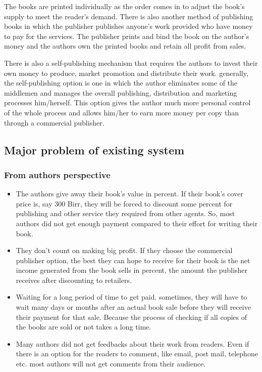 The books are printed individually as the order comes in to adjust the book's supply to meet the reader's demand.  There is also another method of publishing books in which the publisher publishes anyone’s work provided who have money to pay for the services. The publisher prints and bind the book on the author's money and the authors own the printed books and retain all profit from sales.

There is also a self-publishing mechanism that requires the authors to invest their own money to produce, market promotion and distribute their work. generally, the self-publishing option is one in which the author eliminates some of the middlemen and manages the overall publishing, distribution and marketing processes him/herself. This option gives the author much more personal control of the whole process and allows him/her to earn more money per copy than through a commercial publisher.

	\subsection{Major problem of existing system}
		\subsubsection{From authors perspective}

\begin{itemize}
	\item The authors give away their book’s value in percent. If their book's cover price is, say 300 Birr, they will be forced to discount some percent for publishing and other service they required from other agents. So, most authors did not get enough payment compared to their effort for writing their book.
	\item They don't count on making big profit. If they choose the commercial publisher option, the best they can hope to receive for their book is the net income generated from the book sells in percent, the amount the publisher receives after discounting to retailers.
	\item Waiting for a long period of time to get paid. sometimes, they will have to wait many days or months after an actual book sale before they will receive their payment for that sale. Because the process of checking if all copies of the books are sold or not takes a long time.
	\item Many authors did not get feedbacks about their work from readers. Even if there is an option for the readers to comment, like email, post mail, telephone etc. most authors will not get comments from their audience.
\end{itemize}

